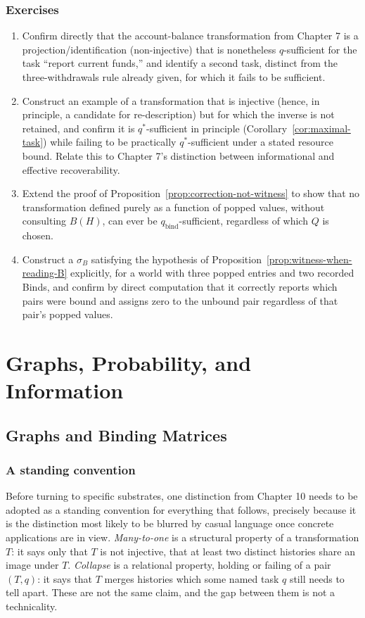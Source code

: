 \documentclass[11pt]{book}
\begin{document}
\section*{Exercises}
\begin{enumerate}
\item Confirm directly that the account-balance transformation from Chapter 7 is a projection/identification (non-injective) that is nonetheless $q$-sufficient for the task ``report current funds,'' and identify a second task, distinct from the three-withdrawals rule already given, for which it fails to be sufficient.
\item Construct an example of a transformation that is injective (hence, in principle, a candidate for re-description) but for which the inverse is not retained, and confirm it is $q^\ast$-sufficient in principle (Corollary~\ref{cor:maximal-task}) while failing to be practically $q^\ast$-sufficient under a stated resource bound. Relate this to Chapter 7's distinction between informational and effective recoverability.
\item Extend the proof of Proposition~\ref{prop:correction-not-witness} to show that no transformation defined purely as a function of popped values, without consulting $B(H)$, can ever be $q_{\mathrm{bind}}$-sufficient, regardless of which $Q$ is chosen.
\item Construct a $\sigma_B$ satisfying the hypothesis of Proposition~\ref{prop:witness-when-reading-B} explicitly, for a world with three popped entries and two recorded Binds, and confirm by direct computation that it correctly reports which pairs were bound and assigns zero to the unbound pair regardless of that pair's popped values.
\end{enumerate}

\part{Graphs, Probability, and Information}

\chapter{Graphs and Binding Matrices}

\section{A standing convention}

Before turning to specific substrates, one distinction from Chapter 10 needs to be adopted as a standing convention for everything that follows, precisely because it is the distinction most likely to be blurred by casual language once concrete applications are in view. \emph{Many-to-one} is a structural property of a transformation $T$: it says only that $T$ is not injective, that at least two distinct histories share an image under $T$. \emph{Collapse} is a relational property, holding or failing of a pair $(T,q)$: it says that $T$ merges histories which some named task $q$ still needs to tell apart. These are not the same claim, and the gap between them is not a technicality.
\end{document}
